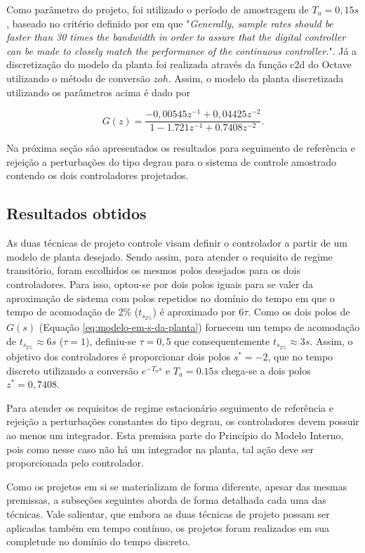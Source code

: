 Como parâmetro do projeto, foi utilizado o período de amostragem de $T_{a} =
0,15 s$, baseado no critério definido por \cite[p. 61]{Franklin1997} em que
"\textit{Generally, sample rates should be faster than 30 times the bandwidth in
order to assure that the digital controller can be made to closely match the
performance of the continuous controller.}". Já a discretização do modelo da
planta foi realizada através da função c2d do Octave utilizando o método de
conversão $zoh$. Assim, o modelo da planta discretizada utilizando os parâmetros
acima é dado por

\begin{equation}
    \label{eq:modelo-em-z-da-planta}
    G(z) = \frac{-0,00545z^{-1} + 0,04425z^{-2}}{1 - 1.721z^{-1} + 0.7408z^{-2}}.
\end{equation}

Na próxima seção são apresentados os resultados para seguimento de referência e
rejeição a perturbações do tipo degrau para o sistema de controle amostrado
contendo os dois controladores projetados.

\subsection{Resultados obtidos}
As duas técnicas de projeto controle visam definir o controlador a partir de um
modelo de planta desejado. Sendo assim, para atender o requisito de regime
transitório, foram escolhidos os mesmos polos desejados para os dois
controladores. Para isso, optou-se por dois polos iguais para se valer da
aproximação de sistema com polos repetidos no domínio do tempo em que o tempo de
acomodação de 2\% ($t_{s_{2\%}}$) é aproximado por $6\tau$. Como os dois polos
de $G(s)$ (Equação \ref{eq:modelo-em-s-da-planta}) fornecem um tempo de
acomodação de $t_{s_{2\%}}\approx 6s$ ($\tau = 1$), definiu-se $\tau = 0,5$ que
consequentemente $t_{s_{2\%}}\approx 3s$. Assim, o objetivo dos
controladores é proporcionar dois polos $s^*=-2$, que no tempo discreto
utilizando a conversão $e^{-T_{a}s}$ e $T_{a} = 0.15s$ chega-se a dois polos
$z^*=0,7408$.

Para atender os requisitos de regime estacionário seguimento de referência e
rejeição a perturbações constantes do tipo degrau, os controladores devem
possuir ao menos um integrador. Esta premissa parte do Princípio do Modelo
Interno, pois como nesse caso não há um integrador na planta, tal ação deve ser
proporcionada pelo controlador.

Como os projetos em si se materializam de forma diferente, apesar das mesmas
premissas, a subseções seguintes aborda de forma detalhada cada uma das
técnicas. Vale salientar, que embora as duas técnicas de projeto possam ser
aplicadas também em tempo contínuo, os projetos foram realizados em sua
completude no domínio do tempo discreto.

